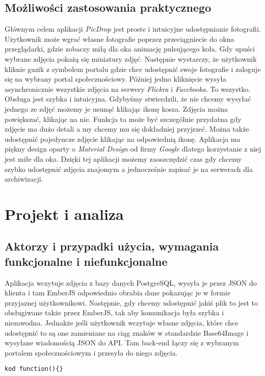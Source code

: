 \documentclass[brudnopis]{xmgr}
\begin{document}
\section{Możliwości zastosowania praktycznego}
Głównym celem aplikacji \textit{PicDrop} jest proste i intuicyjne udostępnianie fotografii. Użytkownik może wgrać własne fotografie poprzez przeciągniecie do okna przeglądarki, gdzie zobaczy miłą dla oka animację pulsującego koła. Gdy upuści wybrane zdjęcia pokażą się miniatury zdjęć. Następnie wystarczy, że użytkownik kliknie guzik z symbolem portalu gdzie chce udostępnić swoje fotografie i zaloguje się na wybrany portal społecznościowy. Później jedno kliknięcie wysyła asynchronicznie wszystkie zdjęcia na serwery \textit{Flickra} i \textit{Facebooka}. To wszystko. Obsługa jest szybka i intuicyjna. Gdybyśmy stwierdzili, że nie chcemy wysyłać jednego ze zdjęć możemy je usunąć klikając ikonę kosza. Zdjęcia można powiększać, klikając na nie. Funkcja ta może być szczególnie przydatna gdy zdjęcie ma dużo detali a my chcemy mu się dokładniej przyjrzeć. Można także udostępnić pojedyncze zdjęcie klikając na  odpowiednią ikonę. Aplikacja ma piękny design oparty o \textit{Material Design} od firmy \textit{Google} dlatego korzystanie z niej jest miłe dla oka. Dzięki tej aplikacji możemy zaoszczędzić czas gdy chcemy szybko udostępnić zdjęcia znajomym a jednocześnie zapisać je na serwerach dla archiwizacji.

\chapter{Projekt i analiza}
\section{Aktorzy i przypadki użycia, wymagania funkcjonalne i niefunkcjonalne}
Aplikacja wczytuje zdjęcia z bazy danych PostgreSQL, wysyła je przez JSON do klienta i tam EmberJS odpowiednio obrabia dane pokazując je w formie przyjaznej użytkownikowi. Następnie, gdy chcemy udostępnić jakiś plik to jest to obsługiwane także przez EmberJS, tak aby komunikacja była szybka i niezawodna. Jednakże jeśli użytkownik wczytuje własne zdjęcia, które chce udostępnić to są one zamieniane na ciąg znaków w standardzie Base64Image i wysyłane wiadomością JSON do API. Tam back-end łączy się z wybranym portalem społecznościowym i przesyła do niego zdjęcia.
\begin{verbatim}
kod function(){}
\end{verbatim}
\end{document}
